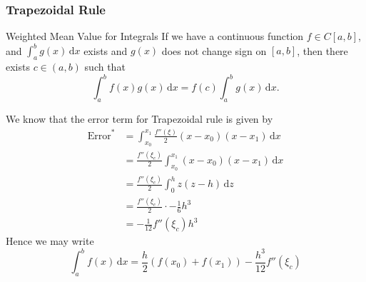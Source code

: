 \documentclass[class=article, crop=false]{standalone}
\begin{document}
  \subsubsection{Trapezoidal Rule}
  \begin{theorem}{Weighted Mean Value for Integrals}
    If we have a continuous function $f\in C[a, b]$, and $\int_{a}^{b}g(x) \,\mathrm dx$ exists and $g(x)$ does not change sign on $[a, b]$, then there exists $c\in (a, b)$ such that
    \[
      \int_{a}^{b}f(x)g(x) \,\mathrm dx = f(c)\int_{a}^{b}g(x) \,\mathrm dx.
    \]
  \end{theorem}
  We know that the error term for Trapezoidal rule is given by
  \begin{align*}
    \text{Error}^* &= \int_{x_0}^{x_1} \frac{f''(\xi)}{2}(x - x_0)(x - x_1) \,\mathrm dx \\
                   &= \frac{f''(\xi_c)}{2} \int_{x_0}^{x_1}(x - x_0)(x - x_1) \,\mathrm dx \tag*{$\xi_c\in (x_0, x_1)$} \\
                   &= \frac{f''(\xi_c)}{2} \int_{0}^{h}z(z - h) \,\mathrm dz \\
                   &= \frac{f''(\xi_c)}{2}\cdot -\frac{1}{6}h^3 \\
                   &= -\frac{1}{12}f''(\xi_c)h^3
  \end{align*}
  Hence we may write
  \[
    \int_{a}^{b}f(x) \,\mathrm dx = \frac{h}{2}(f(x_0) + f(x_1)) - \frac{h^3}{12}f''(\xi_c) \tag*{$\xi_c\in (x_0, x_1)$}
  \]
\end{document}
